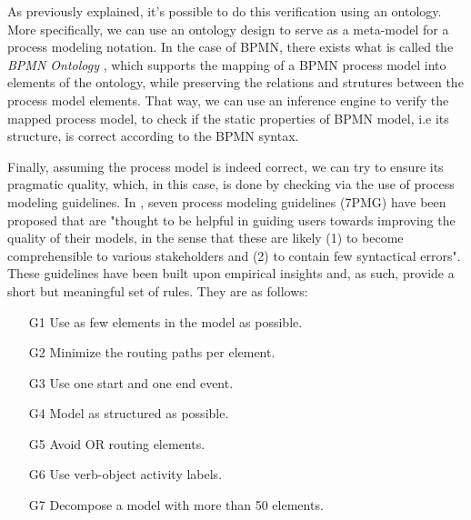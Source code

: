 \documentclass[a4paper,twoside]{article}
\begin{document}
As previously explained, it's possible to do this verification using an ontology. More specifically, we can use an ontology design to serve as a meta-model for a process modeling notation. In the case of BPMN, there exists what is called the \textit{BPMN Ontology} \cite{Rospocher2014foisbpmn}, which supports the mapping of a BPMN process model into elements of the ontology, while preserving the relations and strutures between the process model elements. That way, we can use an inference engine to verify the mapped process model, to check if the static properties of BPMN model, i.e its structure, is correct according to the BPMN syntax.



Finally, assuming the process model is indeed correct, we can try to ensure its pragmatic quality, which, in this case, is done by checking via the use of process modeling guidelines.  In \cite{Mendling2010}, seven process modeling guidelines (7PMG) have been proposed that are "thought to be helpful in guiding users towards improving the quality of their models, in the sense that these are likely (1) to become comprehensible to various stakeholders and (2) to contain few syntactical errors". These guidelines have been built upon empirical insights and, as such, provide a short but meaningful set of rules. They are as follows:
\begin{enumerate}
	\item[G1] Use as few elements in the model as possible.
	\item[G2] Minimize the routing paths per element.
	\item[G3] Use one start and one end event.
	\item[G4] Model as structured as possible. 
	\item[G5] Avoid OR routing elements.
	\item[G6] Use verb-object activity labels.
	\item[G7] Decompose a model with more than 50 elements.
\end{enumerate}
\end{document}
